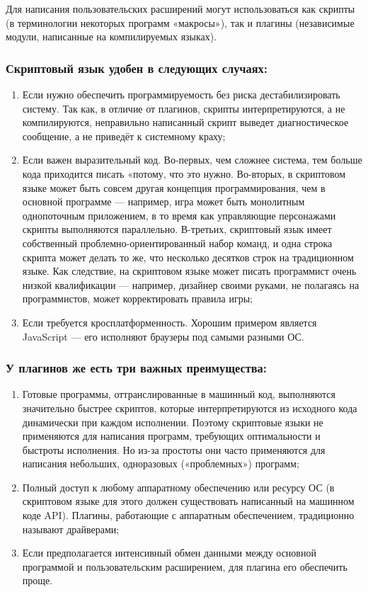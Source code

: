 Для написания пользовательских расширений могут использоваться как скрипты (в терминологии некоторых программ «макросы»), так и плагины (независимые модули, написанные на компилируемых языках).

\subsubsection{Скриптовый язык удобен в следующих случаях:}

\begin{enumerate}
\item Если нужно обеспечить программируемость без риска дестабилизировать систему. Так как, в отличие от плагинов, скрипты интерпретируются, а не компилируются, неправильно написанный скрипт выведет диагностическое сообщение, а не приведёт к системному краху;
\item Если важен выразительный код. Во-первых, чем сложнее система, тем больше кода приходится писать «потому, что это нужно. Во-вторых, в скриптовом языке может быть совсем другая концепция программирования, чем в основной программе — например, игра может быть монолитным однопоточным приложением, в то время как управляющие персонажами скрипты выполняются параллельно. В-третьих, скриптовый язык имеет собственный проблемно-ориентированный набор команд, и одна строка скрипта может делать то же, что несколько десятков строк на традиционном языке. Как следствие, на скриптовом языке может писать программист очень низкой квалификации — например, дизайнер своими руками, не полагаясь на программистов, может корректировать правила игры;
\item Если требуется кросплатформенность. Хорошим примером является JavaScript — его исполняют браузеры под самыми разными ОС.
\end{enumerate}

\subsubsection{У плагинов же есть три важных преимущества:}

\begin{enumerate}
\item Готовые программы, оттранслированные в машинный код, выполняются значительно быстрее скриптов, которые интерпретируются из исходного кода динамически при каждом исполнении. Поэтому скриптовые языки не применяются для написания программ, требующих оптимальности и быстроты исполнения. Но из-за простоты они часто применяются для написания небольших, одноразовых («проблемных») программ;
\item Полный доступ к любому аппаратному обеспечению или ресурсу ОС (в скриптовом языке для этого должен существовать написанный на машинном коде API). Плагины, работающие с аппаратным обеспечением, традиционно называют драйверами;
\item Если предполагается интенсивный обмен данными между основной программой и пользовательским расширением, для плагина его обеспечить проще.
\end{enumerate}

